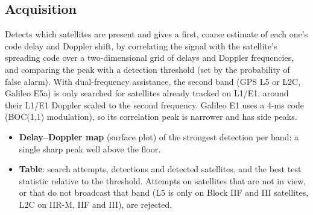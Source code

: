 \documentclass{article}
\begin{document}
\subsection{Acquisition}
Detects which satellites are present and gives a first, coarse estimate of each one's code delay and Doppler shift, by correlating the signal with the satellite's spreading code over a two-dimensional grid of delays and Doppler frequencies, and comparing the peak with a detection threshold (set by the probability of false alarm). With dual-frequency assistance, the second band (GPS L5 or L2C, Galileo E5a) is only searched for satellites already tracked on L1/E1, around their L1/E1 Doppler scaled to the second frequency. Galileo E1 uses a 4-ms code (BOC(1,1) modulation), so its correlation peak is narrower and has side peaks.
\begin{itemize}
  \item \textbf{Delay--Doppler map} (surface plot) of the strongest detection per band: a single sharp peak well above the floor.
  \item \textbf{Table}: search attempts, detections and detected satellites, and the best test statistic relative to the threshold. Attempts on satellites that are not in view, or that do not broadcast that band (L5 is only on Block IIF and III satellites, L2C on IIR-M, IIF and III), are rejected.
\end{itemize}
\end{document}

